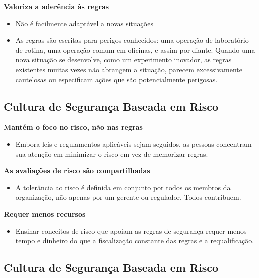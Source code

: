 \documentclass[
  letterpaper,
  DIV=11,
  numbers=noendperiod]{scrartcl}
\providecommand{\tightlist}{%
  \setlength{\itemsep}{0pt}\setlength{\parskip}{0pt}}\usepackage{longtable,booktabs,array}
\begin{document}
\textbf{Valoriza a aderência às regras}

\begin{itemize}
\item
  Não é facilmente adaptável a novas situações
\item
  As regras são escritas para perigos conhecidos: uma operação de
  laboratório de rotina, uma operação comum em oficinas, e assim por
  diante. Quando uma nova situação se desenvolve, como um experimento
  inovador, as regras existentes muitas vezes não abrangem a situação,
  parecem excessivamente cautelosas ou especificam ações que são
  potencialmente perigosas.
\end{itemize}

\subsection{Cultura de Segurança Baseada em
Risco}\label{cultura-de-seguranuxe7a-baseada-em-risco}

\textbf{Mantém o foco no risco, não nas regras}

\begin{itemize}
\tightlist
\item
  Embora leis e regulamentos aplicáveis sejam seguidos, as pessoas
  concentram sua atenção em minimizar o risco em vez de memorizar
  regras.
\end{itemize}

\textbf{As avaliações de risco são compartilhadas}

\begin{itemize}
\tightlist
\item
  A tolerância ao risco é definida em conjunto por todos os membros da
  organização, não apenas por um gerente ou regulador. Todos contribuem.
\end{itemize}

\textbf{Requer menos recursos}

\begin{itemize}
\tightlist
\item
  Ensinar conceitos de risco que apoiam as regras de segurança requer
  menos tempo e dinheiro do que a fiscalização constante das regras e a
  requalificação.
\end{itemize}

\subsection{Cultura de Segurança Baseada em
Risco}\label{cultura-de-seguranuxe7a-baseada-em-risco-1}
\end{document}
